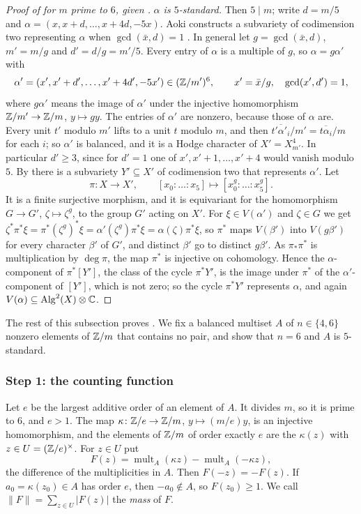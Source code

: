 \begin{proof}[Proof of  for $m$ prime to $6$, given ]
\emph{$\alpha$ is $5$-standard.} Then $5\mid m$; write $d=m/5$ and
$\alpha=(x,x+d,\dots,x+4d,-5x)$. Aoki constructs a subvariety of
codimension two representing $\alpha$ when $\gcd(\bar x,d)=1$
\cite[Theorem~2-1]{Aok87}. In general let $g=\gcd(\bar x,d)$, $m'=m/g$ and
$d'=d/g=m'/5$. Every entry of $\alpha$ is a multiple of $g$, so
$\alpha=g\alpha'$ with
\[
  \alpha'=(x',x'+d',\dots,x'+4d',-5x')\in(\mathbb{Z}/m')^{6},\qquad
  x'=\bar x/g,\quad\gcd(x',d')=1,
\]
where $g\alpha'$ means the image of $\alpha'$ under the injective
homomorphism $\mathbb{Z}/m'\to\mathbb{Z}/m$, $y\mapsto gy$. The entries of $\alpha'$ are
nonzero, because those of $\alpha$ are. Every unit $t'$ modulo $m'$ lifts to a
unit $t$ modulo $m$, and then $\overline{t'\alpha'_{i}}/m'=\overline{t\alpha
_{i}}/m$ for each $i$; so $\alpha'$ is balanced, and it is a
Hodge character of $X'=X^{4}_{m'}$. In particular $d'\ge3$, since for $d'=1$
one of $x',x'+1,\dots,x'+4$ would vanish modulo $5$. By
\cite[Theorem~2-1]{Aok87} there is a subvariety $Y'\subseteq X'$ of
codimension two that represents $\alpha'$. Let
\[
  \pi\colon X\to X',\qquad[x_{0}:\dots:x_{5}]\mapsto[x_{0}^{g}:\dots:x_{5}^{g}].
\]
It is a finite surjective morphism, and it is equivariant for the homomorphism
$G\to G'$, $\zeta\mapsto\zeta^{g}$, to the group $G'$ acting on $X'$. For
$\xi\in V(\alpha')$ and $\zeta\in G$ we get $\zeta^{*}\pi^{*}\xi=\pi^{*}
(\zeta^{g})^{*}\xi=\alpha'(\zeta^{g})\pi^{*}\xi=\alpha(\zeta)\pi^{*}\xi$, so
$\pi^{*}$ maps $V(\beta')$ into $V(g\beta')$ for every character $\beta'$ of
$G'$, and distinct $\beta'$ go to distinct $g\beta'$. As $\pi_{*}\pi^{*}$ is
multiplication by $\deg\pi$, the map $\pi^{*}$ is injective on cohomology.
Hence the $\alpha$-component of $\pi^{*}[Y']$, the class of the cycle
$\pi^{*}Y'$, is the image under $\pi^{*}$ of the $\alpha'$-component of
$[Y']$, which is not zero; so the cycle $\pi^{*}Y'$ represents $\alpha$, and
again $V(\alpha)\subseteq\operatorname{Alg}^{2}(X)\otimes\mathbb{C}$.
\end{proof}

The rest of this subsection proves . We fix a balanced
multiset $A$ of $n\in\{4,6\}$ nonzero elements of $\mathbb{Z}/m$ that contains no
pair, and show that $n=6$ and $A$ is $5$-standard.

\subsubsection*{Step 1: the counting function}
Let $e$ be the largest additive order of an element of $A$. It divides $m$,
so it is prime to $6$, and $e>1$. The map $\kappa\colon\mathbb{Z}/e\to\mathbb{Z}/m$,
$y\mapsto(m/e)y$, is an injective homomorphism, and the elements of $\mathbb{Z}/m$ of
order exactly $e$ are the $\kappa(z)$ with $z\in U=(\mathbb{Z}/e)^{\times}$. For
$z\in U$ put
\[
  F(z)=\operatorname{mult}_{A}(\kappa z)-\operatorname{mult}_{A}(-\kappa z),
\]
the difference of the multiplicities in $A$. Then $F(-z)=-F(z)$. If
$a_{0}=\kappa(z_{0})\in A$ has order $e$, then $-a_{0}\notin A$, so
$F(z_{0})\ge1$. We call $\|F\|=\sum_{z\in U}|F(z)|$ the \emph{mass} of $F$.

